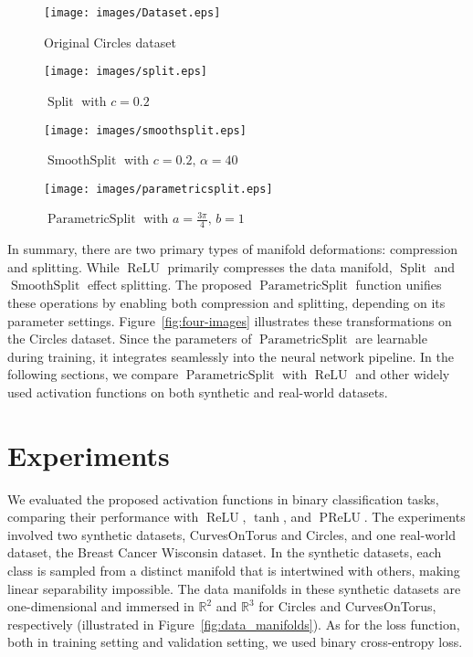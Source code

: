 \documentclass{esannV2}
\DeclareMathOperator{\relu}{\mathrm{ReLU}}
\DeclareMathOperator{\signsplit}{\mathrm{Split}}
\DeclareMathOperator{\smoothsplit}{\mathrm{SmoothSplit}}
\DeclareMathOperator{\parametricsplit}{\mathrm{ParametricSplit}}
\DeclareMathOperator{\prelu}{\mathrm{PReLU}}
\begin{document}
\begin{figure*}[!htbp]
  \centering
  \captionsetup[subfigure]{justification=centering}
  \begin{subfigure}[b]{0.24\textwidth}
    \centering
    \texttt{[image: images/Dataset.eps]}
    \caption{Original Circles dataset}
  \end{subfigure}
  \begin{subfigure}[b]{0.24\textwidth}
    \centering
    \texttt{[image: images/split.eps]}
    \caption{\(\signsplit\) with \(c = 0.2\)}
  \end{subfigure}
  \begin{subfigure}[b]{0.24\textwidth}
    \centering
    \texttt{[image: images/smoothsplit.eps]}
    \caption{\(\smoothsplit\) with \(c = 0.2,\, \alpha = 40\)}
  \end{subfigure}
  \begin{subfigure}[b]{0.24\textwidth}
    \centering
    \texttt{[image: images/parametricsplit.eps]}
    \caption{\(\parametricsplit\) with \(a = \frac{3\pi}{4},\, b = 1\)}
  \end{subfigure}
  \caption{Comparison of different transformations applied to the Circles dataset.}
  \label{fig:four-images}
\end{figure*}

In summary, there are two primary types of manifold deformations: compression and splitting. While \(\relu\) primarily compresses the data manifold, \(\signsplit\) and \(\smoothsplit\) effect splitting. The proposed \(\parametricsplit\) function unifies these operations by enabling both compression and splitting, depending on its parameter settings. Figure~\ref{fig:four-images} illustrates these transformations on the Circles dataset. Since the parameters of \(\parametricsplit\) are learnable during training, it integrates seamlessly into the neural network pipeline. In the following sections, we compare \(\parametricsplit\) with \(\relu\) and other widely used activation functions on both synthetic and real-world datasets.\section{Experiments}

We evaluated the proposed activation functions in binary classification tasks, comparing their performance with \( \relu \), $\tanh$, and \( \prelu \). The experiments involved two synthetic datasets, CurvesOnTorus and Circles, and one real-world dataset, the Breast Cancer Wisconsin dataset. In the synthetic datasets, each class is sampled from a distinct manifold that is intertwined with others, making linear separability impossible. The data manifolds in these synthetic datasets are one-dimensional and immersed in $\mathbb{R}^2$ and $\mathbb{R}^3$ for Circles and CurvesOnTorus, respectively (illustrated in Figure~\ref{fig:data_manifolds}). As for the loss function, both in training setting and validation setting, we used binary cross-entropy loss.
\end{document}
